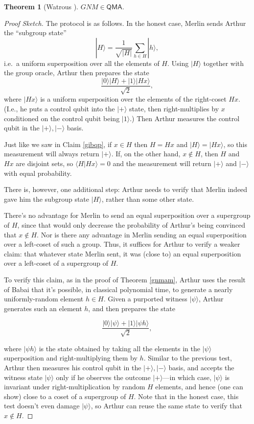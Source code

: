 \documentclass[12pt]{report}
\theoremstyle{plain}
\newtheorem{theorem}{Theorem}[section]
\theoremstyle{definition}
\renewcommand{\ket}[1]{|#1\rangle}
\newcommand{\braket}[2]{\langle#1|#2\rangle}
\begin{document}
\begin{theorem}[Watrous \cite{DBLP:conf/focs/Watrous00}]
\label{gnmqma}
$GNM \in \mathsf{QMA}$.
\end{theorem}
\begin{proof}[Proof Sketch]
The protocol is as follows.  In the honest case, Merlin sends Arthur the ``subgroup state''
\[
\ket{H} = \frac{1}{\sqrt{|H|}} \sum_{h \in H} \ket{h},
\]
i.e.\ a uniform superposition over all the elements of $H$.  Using $\ket{H}$ together with the group oracle, Arthur then prepares the state
\[
\frac{\ket0\ket{H} + \ket1\ket{Hx}}{\sqrt{2}},
\]
where $\ket{Hx}$ is a uniform superposition over the elements of the right-coset $Hx$.  (I.e., he puts a control qubit into the $\ket+$ state, then right-multiplies by $x$ conditioned on the control qubit being $\ket{1}$.)  Then Arthur measures the control qubit in the $\ket+,\ket-$ basis.

Just like we saw in Claim \ref{gibqp}, if $x\in H$ then $H=Hx$ and $\ket{H}=\ket{Hx}$, so this measurement will always return $\ket+$.  If, on the other hand, $x \notin H$, then $H$ and $Hx$ are disjoint sets, so $\braket{H}{Hx}=0$ and the measurement will return $\ket+$ and $\ket-$ with equal probability.

There is, however, one additional step: Arthur needs to verify that Merlin indeed gave him the subgroup state $\ket{H}$, rather than some other state.

There's no advantage for Merlin to send an equal superposition over a supergroup of $H$, since that would only decrease the probability of Arthur's being convinced that $x\not\in H$.  Nor is there any advantage in Merlin sending an equal superposition over a left-coset of such a group.  Thus, it suffices for Arthur to verify a weaker claim: that whatever state Merlin sent, it was (close to) an equal superposition over a left-coset of a supergroup of $H$.

To verify this claim, as in the proof of Theorem \ref{gnmam}, Arthur uses the result of Babai \cite{DBLP:conf/stoc/Babai91} that it's possible, in classical polynomial time, to generate a nearly uniformly-random element $h\in H$.  Given a purported witness $\ket{\psi}$, Arthur generates such an element $h$, and then prepares the state

\[
\frac{\ket0\ket\psi+\ket1\ket{\psi h}}{\sqrt{2}},
\]

\noindent where $\ket{\psi h}$ is the state obtained by taking all the elements in the $\ket{\psi}$ superposition and right-multiplying them by $h$.  Similar to the previous test, Arthur then measures his control qubit in the $\ket+,\ket-$ basis, and accepts the witness state $\ket{\psi}$ only if he observes the outcome $\ket+$---in which case, $\ket{\psi}$ is invariant under right-multiplication by random $H$ elements, and hence (one can show) close to a coset of a supergroup of $H$.  Note that in the honest case, this test doesn't even damage $\ket{\psi}$, so Arthur can reuse the same state to verify that $x\not\in H$.
\end{proof}
\end{document}
